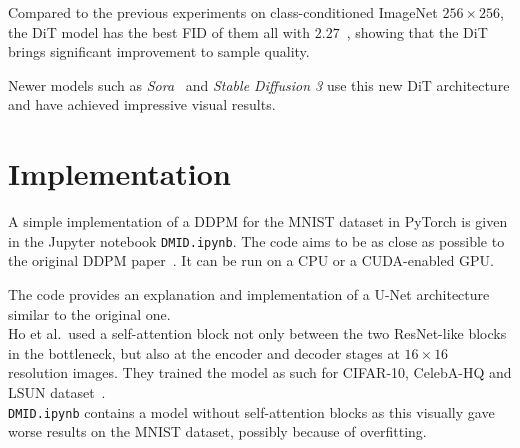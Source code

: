 \documentclass[twoside]{article}
\numberwithin{equation}{section}
\numberwithin{figure}{section}
\begin{document}
Compared to the previous experiments on class-conditioned ImageNet $256 \times 256$, the DiT model has the best FID of them all with $2.27$~\cite{peebles2023scalable}, showing that the DiT brings significant improvement to sample quality.

Newer models such as \textit{Sora}~\cite{videoworldsimulators2024} and \textit{Stable Diffusion 3} use this new DiT architecture and have achieved impressive visual results.

\newpage
\section{Implementation}
A simple implementation of a DDPM for the MNIST dataset in PyTorch is given in the Jupyter notebook \texttt{DMID.ipynb}. The code aims to be as close as possible to the original DDPM paper~\cite{ho2020denoising}. It can be run on a CPU or a CUDA-enabled GPU.

The code provides an explanation and implementation of a U-Net architecture similar to the original one. \\
Ho et al.\ used a self-attention block not only between the two ResNet-like blocks in the bottleneck, but also at the encoder and decoder stages at $16 \times 16$ resolution images. They trained the model as such for CIFAR-10, CelebA-HQ and LSUN dataset~\cite{ho2020denoising}. \\
\texttt{DMID.ipynb} contains a model without self-attention blocks as this visually gave worse results on the MNIST dataset, possibly because of overfitting.
\end{document}
